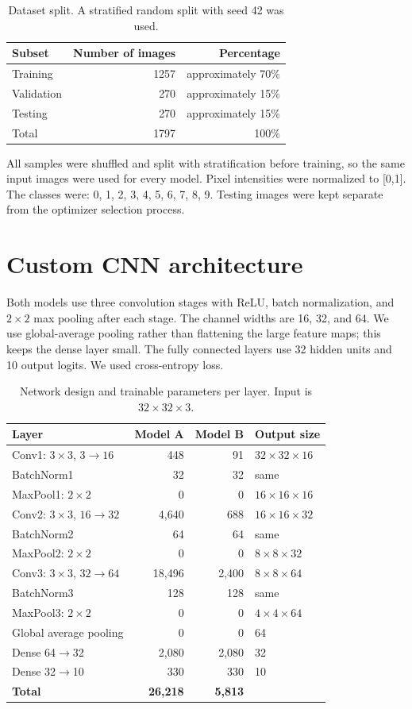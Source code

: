 \documentclass[11pt,a4paper]{article}
\begin{document}
\begin{table}[H]\centering
\caption{Dataset split. A stratified random split with seed 42 was used.}
\begin{tabular}{lrr}\toprule
Subset & Number of images & Percentage \\ \midrule
Training & 1257 & approximately 70\% \\
Validation & 270 & approximately 15\% \\
Testing & 270 & approximately 15\% \\
Total & 1797 & 100\% \\ \bottomrule
\end{tabular}\end{table}

All samples were shuffled and split with stratification before training, so the same input images were used for every model. Pixel intensities were normalized to [0,1]. The classes were: 0, 1, 2, 3, 4, 5, 6, 7, 8, 9. Testing images were kept separate from the optimizer selection process.

\section{Custom CNN architecture}
Both models use three convolution stages with ReLU, batch normalization, and $2\times2$ max pooling after each stage. The channel widths are 16, 32, and 64. We use global-average pooling rather than flattening the large feature maps; this keeps the dense layer small. The fully connected layers use 32 hidden units and 10 output logits. We used cross-entropy loss.

\begin{table}[H]\centering\small
\caption{Network design and trainable parameters per layer. Input is $32\times32\times3$.}
\begin{tabular}{p{5.1cm}rrp{4cm}}\toprule
Layer & Model A & Model B & Output size \\ \midrule
Conv1: $3\times3$, $3\rightarrow16$ & 448 & 91 & $32\times32\times16$ \\
BatchNorm1 & 32 & 32 & same \\
MaxPool1: $2\times2$ & 0 & 0 & $16\times16\times16$ \\
Conv2: $3\times3$, $16\rightarrow32$ & 4,640 & 688 & $16\times16\times32$ \\
BatchNorm2 & 64 & 64 & same \\
MaxPool2: $2\times2$ & 0 & 0 & $8\times8\times32$ \\
Conv3: $3\times3$, $32\rightarrow64$ & 18,496 & 2,400 & $8\times8\times64$ \\
BatchNorm3 & 128 & 128 & same \\
MaxPool3: $2\times2$ & 0 & 0 & $4\times4\times64$ \\
Global average pooling & 0 & 0 & 64 \\
Dense 64$\rightarrow$32 & 2,080 & 2,080 & 32 \\
Dense 32$\rightarrow$10 & 330 & 330 & 10 \\
\midrule
\textbf{Total} & \textbf{26,218} & \textbf{5,813} & \\ \bottomrule
\end{tabular}\end{table}
\end{document}
